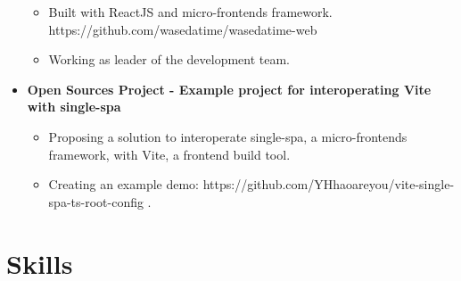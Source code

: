 \begin{itemize}[leftmargin=*]
\begin{itemize}
                \item Built with ReactJS and micro-frontends framework. https://github.com/wasedatime/wasedatime-web
                \item Working as leader of the development team.
        \end{itemize}
    \vspace{-10pt}
    \item{\textbf{Open Sources Project - Example project for interoperating Vite with single-spa}}
        \begin{itemize}
                \vspace{-5pt}
                \item Proposing a solution to interoperate single-spa, a micro-frontends framework, with Vite, a frontend build tool.
                \item Creating an example demo: https://github.com/YHhaoareyou/vite-single-spa-ts-root-config .
        \end{itemize}
\end{itemize}
\vspace{5pt}

\section{Skills}
\vspace{5pt}
\begin{itemize}[leftmargin=*]
\end{itemize}



